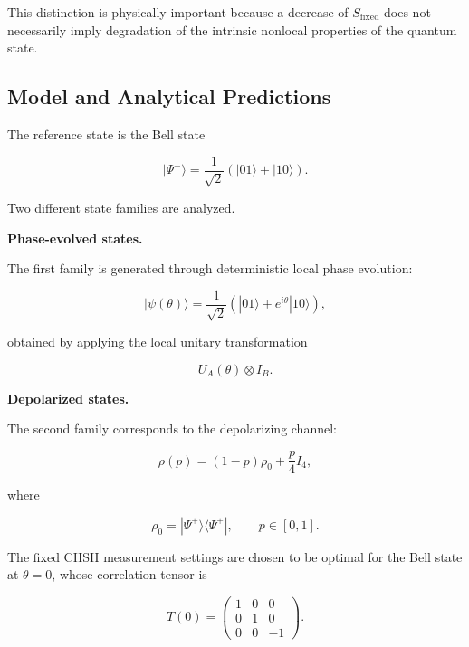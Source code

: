 This distinction is physically important because a decrease of \(S_{\mathrm{fixed}}\) does not necessarily imply degradation of the intrinsic nonlocal properties of the quantum state.


\subsection{Model and Analytical Predictions}

The reference state is the Bell state

\[
|\Psi^+\rangle
=
\frac{1}{\sqrt{2}}
\left(
|01\rangle + |10\rangle
\right).
\]

Two different state families are analyzed.

\medskip

\textbf{Phase-evolved states.}

The first family is generated through deterministic local phase evolution:

\begin{equation}
|\psi(\theta)\rangle
=
\frac{1}{\sqrt{2}}
\left(
|01\rangle + e^{i\theta}|10\rangle
\right),
\label{eq:chsh_phase_state}
\end{equation}

obtained by applying the local unitary transformation

\[
U_A(\theta)
\otimes
I_B.
\]

\medskip

\textbf{Depolarized states.}

The second family corresponds to the depolarizing channel:

\begin{equation}
\rho(p)
=
(1-p)\rho_0
+
\frac{p}{4}I_4,
\label{eq:chsh_depolarized_state}
\end{equation}

where

\[
\rho_0
=
|\Psi^+\rangle
\langle\Psi^+|,
\qquad
p \in [0,1].
\]

\medskip

The fixed CHSH measurement settings are chosen to be optimal for the Bell state at \( \theta = 0 \), whose correlation tensor is

\[
T(0)
=
\begin{pmatrix}
1 & 0 & 0 \\
0 & 1 & 0 \\
0 & 0 & -1
\end{pmatrix}.
\]

